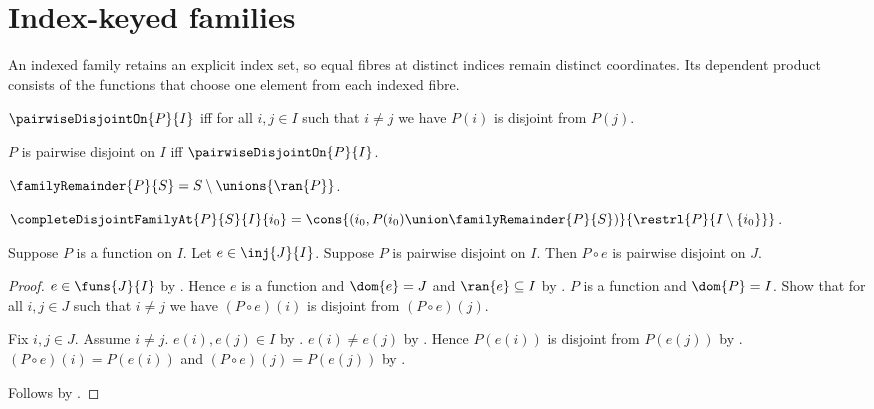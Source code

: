 \section{Index-keyed families}




An indexed family retains an explicit index set, so equal fibres at distinct
indices remain distinct coordinates.  Its dependent product consists of the
functions that choose one element from each indexed fibre.

\begin{definition}\label{pairwise_disjoint_on}
    $\pairwiseDisjointOn{P}{I}$ iff for all $i,j\in I$ such that
        $i\neq j$ we have $P(i)$ is disjoint from $P(j)$.
\end{definition}

\begin{abbreviation}\label{pairwise_disjoint_on_phrase}
    $P$ is pairwise disjoint on $I$ iff $\pairwiseDisjointOn{P}{I}$.
\end{abbreviation}

\begin{definition}\label{family_remainder}
    $\familyRemainder{P}{S}=S\setminus\unions{\ran{P}}$.
\end{definition}

\begin{definition}\label{complete_disjoint_family_at}
    $\completeDisjointFamilyAt{P}{S}{I}{i_0}
        =\cons{(i_0,P(i_0)\union\familyRemainder{P}{S})}
            {\restrl{P}{I\setminus\{i_0\}}}$.
\end{definition}

\begin{proposition}\label{pairwise_disjoint_on_reindex_injection}
    Suppose $P$ is a function on $I$.
    Let $e\in\inj{J}{I}$.
    Suppose $P$ is pairwise disjoint on $I$.
    Then $P\circ e$ is pairwise disjoint on $J$.
\end{proposition}
\begin{proof}
    $e\in\funs{J}{I}$ by .
    Hence $e$ is a function and $\dom{e}=J$ and $\ran{e}\subseteq I$
        by .
    $P$ is a function and $\dom{P}=I$.
    Show that for all $i,j\in J$ such that $i\neq j$
        we have $(P\circ e)(i)$ is disjoint from $(P\circ e)(j)$.
    \begin{subproof}
        Fix $i,j\in J$.
        Assume $i\neq j$.
        $e(i),e(j)\in I$ by .
        $e(i)\neq e(j)$ by .
        Hence $P(e(i))$ is disjoint from $P(e(j))$
            by .
        $(P\circ e)(i)=P(e(i))$ and $(P\circ e)(j)=P(e(j))$
            by .
    \end{subproof}
    Follows by .
\end{proof}

